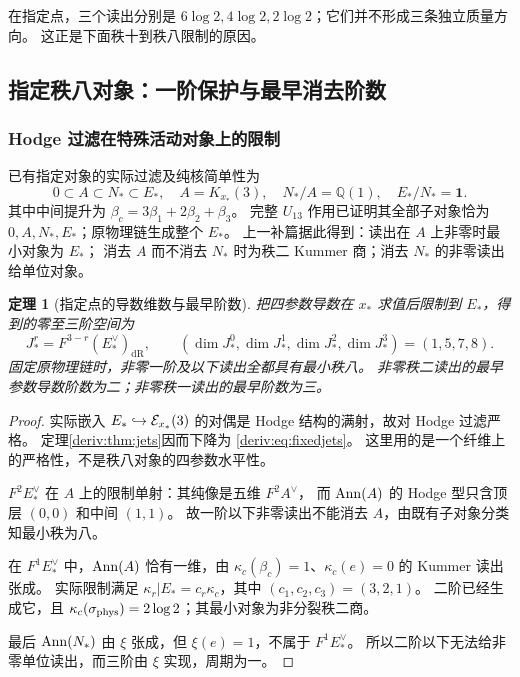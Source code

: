 \documentclass[11pt,a4paper,oneside]{ctexart}
\theoremstyle{cnplain}
\newtheorem{theorem}{定理}[section]
\theoremstyle{definition}
\theoremstyle{remark}
\newcommand{\Q}{\mathbb Q}
\newcommand{\dR}{\mathrm{dR}}
\numberwithin{equation}{section}
\begin{document}
在指定点，三个读出分别是 $6\log2,4\log2,2\log2$；它们并不形成三条独立质量方向。
这正是下面秩十到秩八限制的原因。


\subsection{指定秩八对象：一阶保护与最早消去阶数}
\subsubsection{Hodge 过滤在特殊活动对象上的限制}
已有指定对象的实际过滤及纯核简单性为
\begin{equation}\label{deriv:eq:active}
 0\subset A\subset N_*\subset E_*,\quad
 A=K_{x_*}(3),\quad N_*/A=\Q(1),\quad E_*/N_*=\mathbf1.
\end{equation}
其中中间提升为 $\beta_c=3\beta_1+2\beta_2+\beta_3$。
完整 $U_{13}$ 作用已证明其全部子对象恰为 $0,A,N_*,E_*$；原物理链生成整个 $E_*$。
上一补篇据此得到：读出在 $A$ 上非零时最小对象为 $E_*$；
消去 $A$ 而不消去 $N_*$ 时为秩二 Kummer 商；消去 $N_*$ 的非零读出给单位对象。

\begin{theorem}[指定点的导数维数与最早阶数]\label{deriv:thm:fixed}
把四参数导数在 $x_*$ 求值后限制到 $E_*$，得到的零至三阶空间为
\begin{equation}\label{deriv:eq:fixedjets}
 \boxed{J_*^r=F^{3-r}(E_*^\vee)_{\dR},\qquad
 (\dim J_*^0,\dim J_*^1,\dim J_*^2,\dim J_*^3)=(1,5,7,8).}
\end{equation}
固定原物理链时，非零一阶及以下读出全都具有最小秩八。
非零秩二读出的最早参数导数阶数为二；非零秩一读出的最早阶数为三。
\end{theorem}
\begin{proof}
实际嵌入 $E_*\hookrightarrow\mathcal E_{x_*}(3)$ 的对偶是 Hodge 结构的满射，故对 Hodge 过滤严格。
定理\ref{deriv:thm:jets}因而下降为 \eqref{deriv:eq:fixedjets}。
这里用的是一个纤维上的严格性，不是秩八对象的四参数水平性。

$F^2E_*^\vee$ 在 $A$ 上的限制单射：其纯像是五维 $F^2A^\vee$，
而 $\operatorname{Ann}(A)$ 的 Hodge 型只含顶层 $(0,0)$ 和中间 $(1,1)$。
故一阶以下非零读出不能消去 $A$，由既有子对象分类知最小秩为八。

在 $F^1E_*^\vee$ 中，$\operatorname{Ann}(A)$ 恰有一维，由
$\kappa_c(\beta_c)=1$、$\kappa_c(e)=0$ 的 Kummer 读出张成。
实际限制满足 $\kappa_r|E_*=c_r\kappa_c$，其中 $(c_1,c_2,c_3)=(3,2,1)$。
二阶已经生成它，且 $\kappa_c(\sigma_{\rm phys})=2\log2$；其最小对象为非分裂秩二商。

最后 $\operatorname{Ann}(N_*)$ 由 $\xi$ 张成，但 $\xi(e)=1$，不属于 $F^1E_*^\vee$。
所以二阶以下无法给非零单位读出，而三阶由 $\xi$ 实现，周期为一。
\end{proof}
\end{document}
